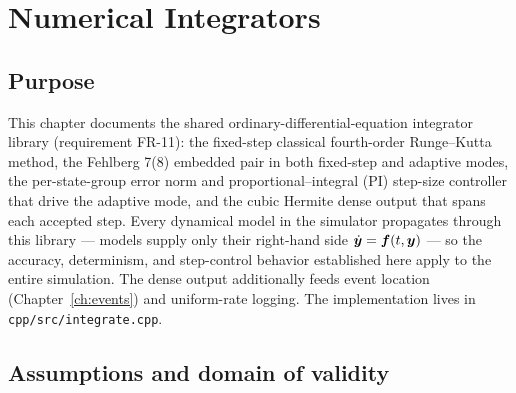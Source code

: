 \chapter{Numerical Integrators}
\label{ch:integrators}

\section{Purpose}
\label{sec:integrators:purpose}

This chapter documents the shared ordinary-differential-equation integrator
library (requirement FR-11): the fixed-step classical fourth-order
Runge--Kutta method, the Fehlberg 7(8) embedded pair in both fixed-step and
adaptive modes, the per-state-group error norm and
proportional--integral (PI) step-size controller that drive the adaptive
mode, and the cubic Hermite dense output that spans each accepted step. Every
dynamical model in the simulator propagates through this library --- models
supply only their right-hand side $\dot{\bm{y}} = \bm{f}(t, \bm{y})$ --- so
the accuracy, determinism, and step-control behavior established here apply
to the entire simulation. The dense output additionally feeds event location
(Chapter~\ref{ch:events}) and uniform-rate logging. The implementation lives
in \texttt{cpp/src/integrate.cpp}.

\section{Assumptions and domain of validity}
\label{sec:integrators:domain}

